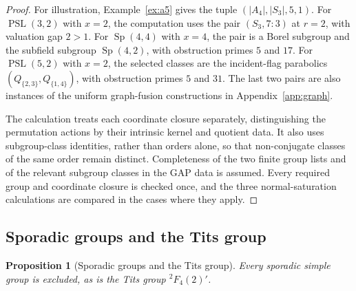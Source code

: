 \documentclass[11pt]{amsart}
\newtheorem{proposition}[theorem]{Proposition}
\theoremstyle{definition}
\theoremstyle{remark}
\DeclareMathOperator{\PSL}{PSL}
\DeclareMathOperator{\Sp}{Sp}
\begin{document}
\begin{proof}
For illustration, Example~\ref{ex:a5} gives the tuple
$(|A_4|,|S_3|,5,1)$. For $\PSL(3,2)$ with $x=2$, the computation uses
the pair $(S_3,7{:}3)$ at $r=2$, with valuation gap $2>1$.
For $\Sp(4,4)$ with $x=4$, the pair is a Borel subgroup and the subfield
subgroup $\Sp(4,2)$, with obstruction primes $5$ and $17$. For
$\PSL(5,2)$ with $x=2$, the selected classes are the incident-flag
parabolics $(Q_{\{2,3\}},Q_{\{1,4\}})$, with obstruction primes $5$ and
$31$. The last two pairs are also instances of the uniform graph-fusion
constructions in Appendix~\ref{app:graph}.

The calculation treats each coordinate closure separately, distinguishing the
permutation actions by their intrinsic kernel and quotient data. It also uses
subgroup-class identities, rather than orders alone, so that non-conjugate
classes of the same order remain distinct. Completeness of the two finite
group lists and of the relevant subgroup classes in the GAP data is assumed.
Every required group and coordinate closure is checked once, and the three
normal-saturation calculations are compared in the cases where they apply.
\end{proof}

\subsection{Sporadic groups and the Tits group}

\begin{proposition}[Sporadic groups and the Tits group]\label{prop:sporadic}
Every sporadic simple group is excluded, as is the Tits group
${}^2F_4(2)'$.
\end{proposition}
\end{document}
